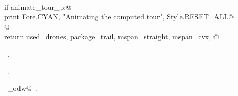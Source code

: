 \documentclass[12.0pt]{report}
\begin{document}
\begin{flushleft}
\begin{list}{}{}
\mbox{}\verb@@\\
\mbox{}\verb@    if animate_tour_p:@\\
\mbox{}\verb@         print Fore.CYAN, "Animating the computed tour", Style.RESET_ALL@\\
\mbox{}\verb@    @\\
\mbox{}\verb@    return used_drones, package_trail, mspan_straight, mspan_cvx, @\\
\mbox{}\verb@@{\NWsep}
\end{list}
\vspace{-1.5ex}
\footnotesize
\begin{list}{}{\setlength{\itemsep}{-\parsep}\setlength{\itemindent}{-\leftmargin}}
\item \NWtxtMacroDefBy\ .
\item \NWtxtMacroRefIn\ .
\item \NWtxtIdentsDefed\nobreak\  \verb@algo_odw@\nobreak\ .
\item{}
\end{list}
\vspace{4ex}
\end{flushleft}

 
\end{document}
